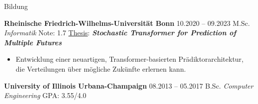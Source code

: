 \begin{rubric}{Bildung}


\entry*[] \textbf{Rheinische Friedrich-Wilhelms-Universität Bonn} \hfill 10.2020 -- 09.2023  \newline
  M.Sc. \emph{Informatik}  \hfill Note:  1.7 \newline %
  \underline{Thesis}:  \hspace*{5mm} \textit{\textbf{Stochastic Transformer for Prediction of Multiple Futures}} \newline 
  \vspace{\CVItemizeHeaderSpacing} \begin{itemize}[leftmargin=*, rightmargin=1cm]
  	\setlength{\itemsep}{\CVItemizeSpacing}  
  	\item Entwicklung einer neuartigen, Transformer-basierten Prädiktorarchitektur, die Verteilungen über mögliche Zukünfte erlernen kann.
 \end{itemize}

\entry*[] \textbf{University of Illinois Urbana-Champaign} \hfill 08.2013 -- 05.2017  \newline
 B.Sc. \emph{Computer Engineering} \hfill GPA: 3.55/4.0 \newline %



\end{rubric}
